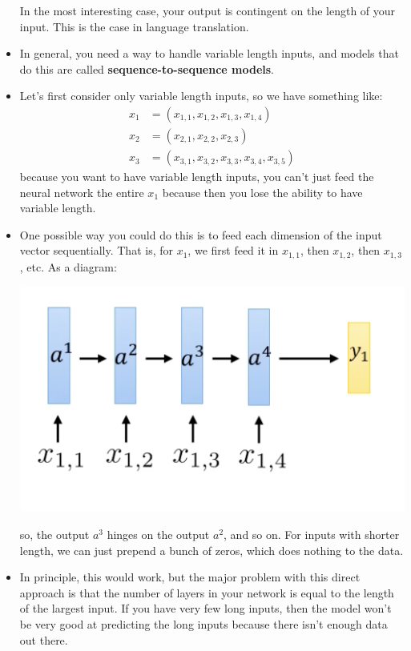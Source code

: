 \begin{itemize}
		In the most interesting case, your output is contingent on the length of your
		input. This is the case in language translation. 
	\item In general, you need a way to handle variable length inputs, and models
		that do this are called \textbf{sequence-to-sequence models}.
	\item Let's first consider only variable length inputs, so we have something
		like:
		\begin{align*}
			x_1 &= (x_{1, 1}, x_{1, 2}, x_{1, 3}, x_{1, 4})\\
			x_2 &= (x_{2, 1}, x_{2, 2}, x_{2, 3}) \\ 
			x_3 &= (x_{3, 1}, x_{3, 2}, x_{3, 3}, x_{3, 4}, x_{3, 5}) 
		\end{align*}
		because you want to have variable length inputs, you can't just feed the
		neural network the entire \( x_1 \) because then you lose the ability to have
		variable length. 
	\item One possible way you could do this is to feed each dimension of the input
		vector sequentially. That is, for \( x_1 \), we first feed it in \( x_{1, 1}
		\), then \( x_{1, 2} \), then \( x_{1, 3} \), etc. As a diagram:
		\begin{center}
			\includegraphics[scale=0.7]{images/lec11-1.png}
		\end{center}
		so, the output \( a^{3} \) hinges on the output \( a^2 \), and so on.
		For inputs with shorter length, we can just prepend a bunch of zeros, which
		does nothing to the data.
	\item In principle, this would work, but the major problem with this direct
		approach is that the number of layers in your network is equal to the length
		of the largest input. If you have very few long inputs, then the model won't
		be very good at predicting the long inputs because there isn't enough data
		out there. 


\end{itemize}
